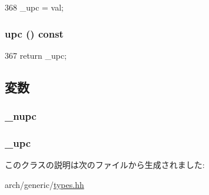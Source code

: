 \begin{DoxyCode}
368 { _upc = val; }
\end{DoxyCode}
\hypertarget{classGenericISA_1_1DelaySlotUPCState_a58857cf73ead03fe3a2e9ca79587f326}{
\subsubsection[{upc}]{ upc () const}}
\label{classGenericISA_1_1DelaySlotUPCState_a58857cf73ead03fe3a2e9ca79587f326}



\begin{DoxyCode}
367 { return _upc; }
\end{DoxyCode}


\subsection{変数}
\hypertarget{classGenericISA_1_1DelaySlotUPCState_ac04fdfa88334f532e3358ae2d9cff2cd}{
\subsubsection[{\_\-nupc}]{ {\bf \_\-nupc}}}
\label{classGenericISA_1_1DelaySlotUPCState_ac04fdfa88334f532e3358ae2d9cff2cd}
\hypertarget{classGenericISA_1_1DelaySlotUPCState_ada1172c4155a1a9d7c37c92ca5326ba7}{
\subsubsection[{\_\-upc}]{ {\bf \_\-upc}}}
\label{classGenericISA_1_1DelaySlotUPCState_ada1172c4155a1a9d7c37c92ca5326ba7}


このクラスの説明は次のファイルから生成されました:\begin{DoxyCompactItemize}
\item 
arch/generic/\hyperlink{arch_2generic_2types_8hh}{types.hh}\end{DoxyCompactItemize}
